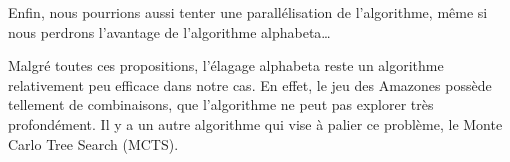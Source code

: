 Enfin, nous pourrions aussi tenter une parallélisation de l'algorithme, même si nous perdrons
l'avantage de l'algorithme alphabeta\dots

Malgré toutes ces propositions, l'élagage alphabeta reste un algorithme relativement peu efficace dans notre cas. En effet, le jeu des Amazones
possède tellement de combinaisons, que l'algorithme ne peut pas explorer très profondément.
Il y a un autre algorithme qui vise à palier ce problème, le Monte Carlo Tree Search (MCTS).